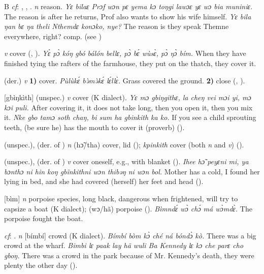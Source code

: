 \begin{letter}{B}
 \textit{cf}: , , . \textit{n} reason. \textit{Yɛ bilaɛ Prɔf wɔn pɛ yema kɔ toŋgi lawɔɛ yɛ wɔ bia muniniɛ.} The reason is after he returns, Prof also wants to show his wife himself. \textit{Yɛ bila ŋan bɛ ŋa theli Nthemdɛ konɔko, nye?} The reason is they speak Themne everywhere, right? comp.  (see ) 

 \textit{v} cover (\citealt{Pichl1967}, \citealt{Sumner1921}). \textit{Yɛ̀ pɔ̀ kóŋ gbó bálón bellɛ, pɔ̀ bɛ́ wùsɛ̀, pɔ̀ ŋɔ̀ bím.} When they have finished tying the rafters of the farmhouse, they put on the thatch, they cover it.

 (der.) \textit{v} \textbf{1)} cover. \textit{Pùlùkɛ́ bə̀mə̀kɛ́ lɛ́llɛ̀.} Grass covered the ground. \textbf{2)} close (\citealt{Pichl1967}, \citealt{Sumner1921}).

 [gbìŋkìth] (unspec.) \textit{v} cover (K dialect). \textit{Yɛ mɔ gbiŋgithɛ, la cheŋ vei mɔi yi, mɔ kɔi puli.} After covering it, it does not take long, then you open it, then you mix it. \textit{Nke gbo tamɔ soth chaŋ, bi sum ha gbinkith ka ko.} If you see a child sprouting teeth, (be sure he) has the mouth to cover it (proverb) (\citealt{TISLL1979}).

 (unspec.), (der. of ) \textit{n} (hɔ̃/tha) cover, lid (\citealt{Pichl1967}); \textit{kpinkith} cover (both \textit{n} and \textit{v}) (\citealt{Sumner1921}). 

 (unspec.), (der. of ) \textit{v} cover oneself, e.g., with blanket (\citealt{Pichl1967}). \textit{Ihee hɔ̃ peyɛni mi, ya bɔnthɔ ni hin koŋ gbïnkithni wɔn thibəŋ ni wɔn bol.} Mother has a cold, I found her lying in bed, and she had covered (herself) her feet and head (\citealt{Pichl1967}). 

 [bìm] \textit{n} porpoise species, long black, dangerous when frightened, will try to capsize a boat (K dialect); (wɔ/hã) porpoise (\citealt{Pichl1967}). \textit{Bìmndɛ́ wɔ̀ chɔ́ má wɔ̀mdɛ̀.} The porpoise fought the boat.

 \textit{cf}: . \textit{n} [bímbí] crowd (K dialect). \textit{Bímbí bòm kɔ̀ ché ná bóndɔ̀ kò.} There was a big crowd at the wharf. \textit{Bimbi lɛ paak lay hã wuli Ba Kennedy lɛ kɔ che parɛ cho gboŋ.} There was a crowd in the park because of Mr. Kennedy's death, they were plenty the other day (\citealt{Pichl1967}). 


\end{letter}
